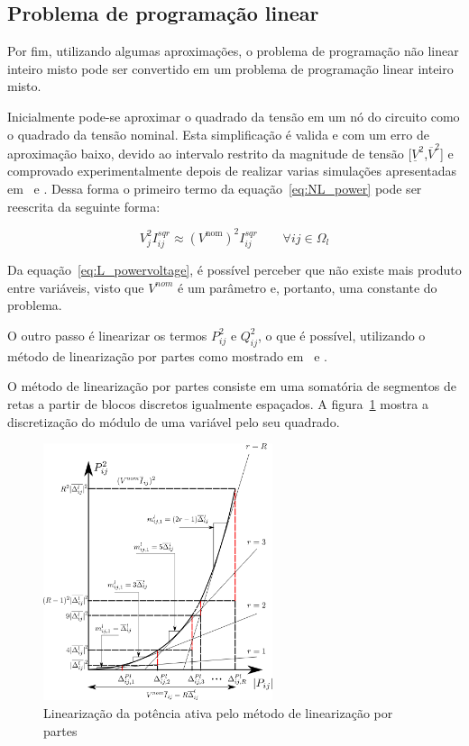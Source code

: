 \subsection{Problema de programação linear}

Por fim, utilizando algumas aproximações, o problema de programação não linear inteiro misto pode ser convertido em um problema de programação linear inteiro misto.

Inicialmente pode-se aproximar o quadrado da tensão em um nó do circuito como o quadrado da tensão nominal.
Esta simplificação é valida e com um erro de aproximação baixo, devido ao intervalo restrito da magnitude de tensão [$\underline{V}^2$,$\overline{V}^2$] e comprovado experimentalmente depois de realizar varias simulações apresentadas em~\cite{Goncalves2013ModelosRadiais} e \cite{Alves2012Alocacao-}.
Dessa forma o primeiro termo da equação~\ref{eq:NL_power} pode ser reescrita da seguinte forma:

\begin{equation}\label{eq:L_powervoltage}
    V_{j}^{2}I_{ij}^{sqr} \approx (V^{\text{nom}})^{2}I_{ij}^{sqr}\qquad\forall ij\in\Omega_{l}
\end{equation}

Da equação~\ref{eq:L_powervoltage}, é possível perceber que não existe mais produto entre variáveis, visto que $V^{nom}$ é um parâmetro e, portanto, uma constante do problema.

O outro passo é linearizar os termos $P_{ij}^2$ e $Q_{ij}^2$, o que é possível, utilizando o método de linearização por partes como mostrado em~\cite{Goncalves2013ModelosRadiais} e \cite{Alves2012Alocacao-}.

O método de linearização por partes consiste em uma somatória de segmentos de retas a partir de blocos discretos igualmente espaçados.
A figura~\ref{fig:linearization} mostra a discretização do módulo de uma variável pelo seu quadrado.

\begin{figure}[H]
    \centering
    \includegraphics[width = 0.6\textwidth]{5_Formulation/lin.png}
    \caption{Linearização da potência ativa pelo método de linearização por partes}
    \label{fig:linearization}
\end{figure}{}

